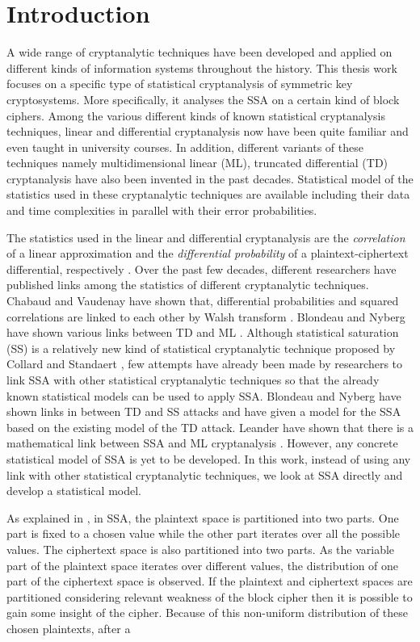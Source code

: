 \chapter{Introduction}
\label{chapter:intro}
A wide range of cryptanalytic techniques have been developed and applied on different kinds of information systems throughout the history. This thesis work focuses on a specific type of statistical cryptanalysis of symmetric key cryptosystems. More specifically, it analyses the SSA on a certain kind of block ciphers. Among the various different kinds of known statistical cryptanalysis techniques, linear and differential cryptanalysis now have been quite familiar and even taught in university courses. In addition, different variants of these techniques namely multidimensional linear (ML), truncated differential (TD) cryptanalysis have also been invented in the past decades. Statistical model of the statistics used in these cryptanalytic techniques are available including their data and time complexities in parallel with their error probabilities. \par \noindent The statistics used in the linear and differential cryptanalysis are the \textit{correlation} of a linear approximation  and the \textit{differential probability} of a plaintext-ciphertext differential, respectively \cite{Celine_Kaisa_Links_2013}. Over the past few decades, different researchers have published links among the statistics of different cryptanalytic techniques. Chabaud and Vaudenay have shown that, differential probabilities and squared correlations are linked to each other by Walsh transform \cite{Chabaud_Vaudenay_link}. Blondeau and Nyberg have shown various links between TD and ML \cite{Celine_Kaisa_Links_2013,Celine_Kaisa_Links_2014}. Although statistical saturation (SS) is a relatively new kind of statistical cryptanalytic technique proposed by Collard and Standaert \cite{SSA_Collard_Standaert}, few attempts have already been made by researchers to link SSA with other statistical cryptanalytic techniques so that the already known statistical models can be used to apply SSA. Blondeau and Nyberg have shown links in between TD and SS \cite{Celine_Kaisa_Links_2014} attacks and have given a model for the SSA based on the existing model of the TD attack. Leander have shown that there is a mathematical link between SSA and ML cryptanalysis \cite{Leander_link}. However, any concrete statistical model of SSA is yet to be developed. In this work, instead of using any link with other statistical cryptanalytic techniques, we look at SSA directly and develop a statistical model.\par \noindent As explained in \cite{SSA_Collard_Standaert}, in SSA, the plaintext space is  partitioned into two parts. One part is fixed to a chosen value while the other part iterates over all the possible values. The ciphertext space is also partitioned into two parts. As the variable part of the plaintext space iterates over different values, the distribution of one part of the ciphertext space is observed. If the plaintext and ciphertext spaces are partitioned considering relevant weakness of the block cipher then it is possible to gain some insight of the cipher. Because of this non-uniform distribution of these chosen plaintexts, after a 